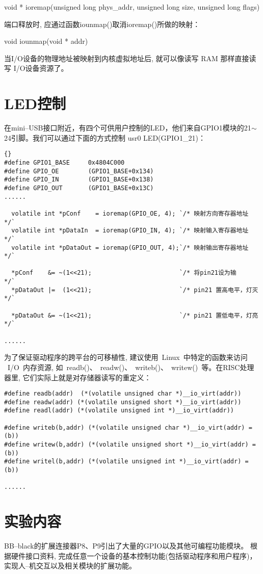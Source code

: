 	void * ioremap(unsigned long phys\_addr, unsigned long size, unsigned long
flags)

	端口释放时, 应通过函数iounmap()取消ioremap()所做的映射：

	void iounmap(void * addr)

	当I/O设备的物理地址被映射到内核虚拟地址后, 就可以像读写 RAM 那样直接读写
I/O设备资源了。

\section{LED控制}
	在mini--USB接口附近，有四个可供用户控制的LED，他们来自GPIO1模块的21$\sim$
24引脚。我们可以通过下面的方式控制 usr0 LED(GPIO1\_21)：

\normalsize
\lstset{language=c, escapeinside=``}
\begin{lstlisting}{}
#define GPIO1_BASE     0x4804C000
#define GPIO_OE        (GPIO1_BASE+0x134)
#define GPIO_IN        (GPIO1_BASE+0x138)
#define GPIO_OUT       (GPIO1_BASE+0x13C)
......

  volatile int *pConf    = ioremap(GPIO_OE, 4); `/* 映射方向寄存器地址 */`
  volatile int *pDataIn  = ioremap(GPIO_IN, 4); `/* 映射输入寄存器地址 */`
  volatile int *pDataOut = ioremap(GPIO_OUT, 4);`/* 映射输出寄存器地址 */`

  *pConf    &= ~(1<<21);                        `/* 将pin21设为输      */`
  *pDataOut |=  (1<<21);                        `/* pin21 置高电平，灯灭 */`

  *pDataOut &= ~(1<<21);                        `/* pin21 置低电平，灯亮 */`

......
\end{lstlisting}
\large

	为了保证驱动程序的跨平台的可移植性, 建议使用~Linux~中特定的函数来访问
~I/O~内存资源, 如~readb()、~readw()、~writeb()、~writew()~等。在RISC处理器里, 
它们实际上就是对存储器读写的重定义：

\begin{verbatim}
#define readb(addr)  (*(volatile unsigned char *)__io_virt(addr))
#define readw(addr) (*(volatile unsigned short *)__io_virt(addr))
#define readl(addr) (*(volatile unsigned int *)__io_virt(addr))

#define writeb(b,addr) (*(volatile unsigned char *)__io_virt(addr) = (b))
#define writew(b,addr) (*(volatile unsigned short *)__io_virt(addr) = (b))
#define writel(b,addr) (*(volatile unsigned int *)__io_virt(addr) = (b))

......
\end{verbatim}

\section{实验内容}
	BB--black的扩展连接器P8、P9引出了大量的GPIO以及其他可编程功能模块。
根据硬件接口资料, 完成任意一个设备的基本控制功能(包括驱动程序和用户程序)，
实现人--机交互以及相关模块的扩展功能。
